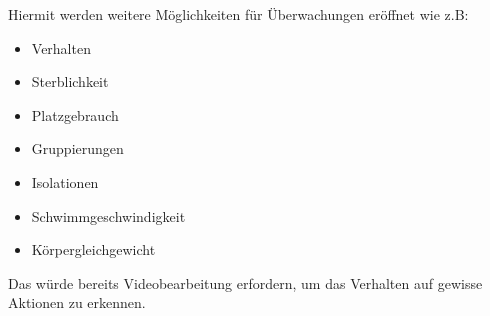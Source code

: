\documentclass[../main.tex]{subfiles}
\begin{document}
	\par \noindent
	Hiermit werden weitere Möglichkeiten für Überwachungen eröffnet wie z.B:
	
	\begin{itemize}
		\item Verhalten 
		\item Sterblichkeit
		\item Platzgebrauch
		\item Gruppierungen
		\item Isolationen
		\item Schwimmgeschwindigkeit
		\item Körpergleichgewicht
	\end{itemize}
	\noindent
	Das würde bereits Videobearbeitung erfordern, um das Verhalten auf gewisse Aktionen zu erkennen. 
	
\end{document}
